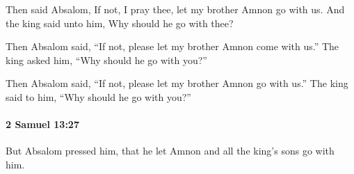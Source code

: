 			\begin{versebox}
					\item[BHS] 
					\item[ASV] Then said Absalom, If not, I pray thee, let my brother Amnon go with us. And the king said unto him, Why should he go with thee?
					\item[NIV] Then Absalom said, “If not, please let my brother Amnon come with us.” The king asked him, “Why should he go with you?”
					\item[NRSV] Then Absalom said, “If not, please let my brother Amnon go with us.” The king said to him, “Why should he go with you?”
			\end{versebox}

		\paragraph{2 Samuel 13:27} %
			\label{2SAMUEL-13-27}

			But Absalom pressed him, that he let Amnon and all the king’s sons go with him.

